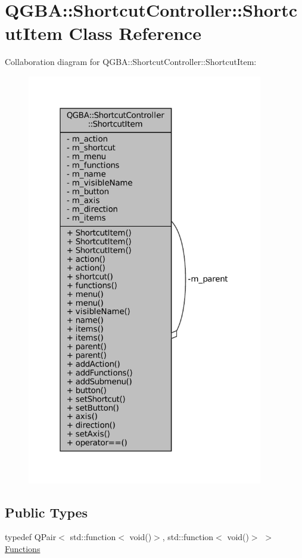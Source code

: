 \hypertarget{class_q_g_b_a_1_1_shortcut_controller_1_1_shortcut_item}{}\section{Q\+G\+BA\+:\+:Shortcut\+Controller\+:\+:Shortcut\+Item Class Reference}
\label{class_q_g_b_a_1_1_shortcut_controller_1_1_shortcut_item}


Collaboration diagram for Q\+G\+BA\+:\+:Shortcut\+Controller\+:\+:Shortcut\+Item\+:
\nopagebreak
\begin{figure}[H]
\begin{center}
\leavevmode
\includegraphics[width=292pt]{class_q_g_b_a_1_1_shortcut_controller_1_1_shortcut_item__coll__graph}
\end{center}
\end{figure}
\subsection*{Public Types}
\begin{DoxyCompactItemize}
\item 
typedef Q\+Pair$<$ std\+::function$<$ void()$>$, std\+::function$<$ void()$>$ $>$ \mbox{\hyperlink{class_q_g_b_a_1_1_shortcut_controller_1_1_shortcut_item_a28ffcf4fe5bf253d0d47e2357794ddf1}{Functions}}
\end{DoxyCompactItemize}
